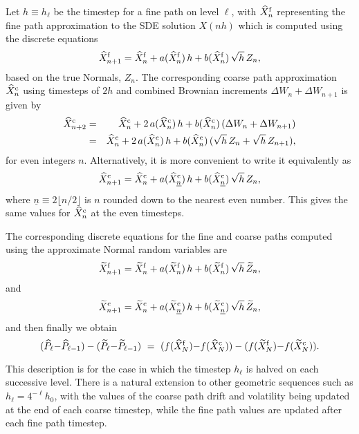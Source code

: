 \documentclass[11pt]{article}
\def \tP {{\widetilde{P}}}
\def \tZ {{\widetilde{Z}}}
\def \tXfnp {{\widetilde{X}^{\rm f}_{n+1}}}
\def \tXcnp {{\widetilde{X}^{\rm c}_{n+1}}}
\def \tXfn {{\widetilde{X}^{\rm f}_n}}
\def \tXf  {{\widetilde{X}^{\rm f}}}
\def \tXcn {{\widetilde{X}^{\rm c}_n}}
\def \tXc  {{\widetilde{X}^{\rm c}}}
\def \tXcl {{\widetilde{X}^{\rm c}_{\underline{n}}}}
\def \hP {{\widehat{P}}}
\def \hXfnp {{\widehat{X}^{\rm f}_{n+1}}}
\def \hXcnp {{\widehat{X}^{\rm c}_{n+1}}}
\def \hXcpp {{\widehat{X}^{\rm c}_{n+2}}}
\def \hXfn {{\widehat{X}^{\rm f}_n}}
\def \hXf {{\widehat{X}^{\rm f}}}
\def \hXcn {{\widehat{X}^{\rm c}_n}}
\def \hXc {{\widehat{X}^{\rm c}}}
\def \hXcl {{\widehat{X}^{\rm c}_{\underline{n}}}}
\begin{document}
Let $h\equiv h_\ell$ be the timestep for a fine path on level $\ell$,
with $\hXfn$ representing the fine path approximation to the SDE
solution $X(nh)$ which is computed using the discrete equations
\begin{equation}
\hXfnp = \hXfn + a(\hXfn)\, h + b(\hXfn)\, \sqrt{h}\, Z_n,
\label{eq:hf}
\end{equation}
based on the true Normals, $Z_n$.  The corresponding coarse path 
approximation $\hXcn$ using timesteps of $2h$ and combined
Brownian increments $\Delta W_n {+} \Delta W_{n+1}$ is given by 
\begin{eqnarray*}
\hXcpp
   &=& \hXcn + 2\, a(\hXcn)\, h + b(\hXcn)\, (\Delta W_n + \Delta W_{n+1})
\\ &=& \hXcn + 2\, a(\hXcn)\, h + b(\hXcn)\, (\sqrt{h}\, Z_n + \sqrt{h}\, Z_{n+1}),
\end{eqnarray*}
for even integers $n$.  Alternatively, it is more convenient 
to write it equivalently as
\begin{equation}
\hXcnp = \hXcn + a(\hXcl)\, h + b(\hXcl)\, \sqrt{h}\, Z_n,
\label{eq:hc}
\end{equation}
where $\underline{n} \equiv 2 \lfloor n/2 \rfloor$ is $n$ rounded 
down to the nearest even number. This gives the same values 
for $\hXcn$ at the even timesteps.

The corresponding discrete equations for the fine and coarse paths 
computed using the approximate Normal random variables are
\begin{equation}
\tXfnp = \tXfn + a(\tXfn)\, h + b(\tXfn)\, \sqrt{h}\, \tZ_n,
\label{eq:tf}
\end{equation}
and
\begin{equation}
\tXcnp = \tXcn + a(\tXcl)\, h + b(\tXcl)\, \sqrt{h}\, \tZ_n,
\label{eq:tc}
\end{equation}
and then finally we obtain
\[
(\hP_\ell {-} \hP_{\ell-1}) - (\tP_\ell {-} \tP_{\ell-1})
  \ =\ 
(f(\hXf_N) {-} f(\hXc_N)) -  (f(\tXf_N) {-} f(\tXc_N)).
\]

This description is for the case in which the timestep $h_\ell$ is halved
on each successive level.  There is a natural extension to other geometric
sequences such as $h_\ell = 4^{-\ell} h_0$, with the values of the coarse path 
drift and volatility being updated at the end of each coarse timestep, while
the fine path values are updated after each fine path timestep.

\end{document}

